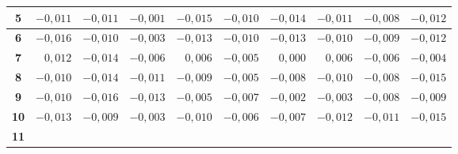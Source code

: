 \begin{table} [htbp]
{\begin{tabular}{|c|rrr|rrr|rrr|}
			\textbf{5}                  & 
			\multicolumn{1}{r|}{$-0,011$}        & \multicolumn{1}{r|}{$-0,011$}       & $-0,001$                            & \multicolumn{1}{r|}{$-0,015$}        & \multicolumn{1}{r|}{$-0,010$}       & $-0,014$                            & \multicolumn{1}{r|}{$-0,011$}        & \multicolumn{1}{r|}{$-0,008$}       & $-0,012$                            \\ \hline
			\textbf{6}                  & 
			\multicolumn{1}{r|}{$-0,016$}        & \multicolumn{1}{r|}{$-0,010$}       & $-0,003$                            & \multicolumn{1}{r|}{$-0,013$}        & \multicolumn{1}{r|}{$-0,010$}       & $-0,013$                            & \multicolumn{1}{r|}{$-0,010$}        & \multicolumn{1}{r|}{$-0,009$}       & $-0,012$                            \\ \hline
			\textbf{7}                  & 
			\multicolumn{1}{r|}{$ 0,012$}        & \multicolumn{1}{r|}{$-0,014$}       & $-0,006$                            & \multicolumn{1}{r|}{$ 0,006$}        & \multicolumn{1}{r|}{$-0,005$}       & $ 0,000$                            & \multicolumn{1}{r|}{$ 0,006$}        & \multicolumn{1}{r|}{$-0,006$}       & $-0,004$                            \\ \hline
			\textbf{8}                  & 
			\multicolumn{1}{r|}{$-0,010$}        & \multicolumn{1}{r|}{$-0,014$}       & $-0,011$                            & \multicolumn{1}{r|}{$-0,009$}        & \multicolumn{1}{r|}{$-0,005$}       & $-0,008$                            & \multicolumn{1}{r|}{$-0,010$}        & \multicolumn{1}{r|}{$-0,008$}       & $-0,015$                            \\ \hline
			\textbf{9}                  & 
			\multicolumn{1}{r|}{$-0,010$}        & \multicolumn{1}{r|}{$-0,016$}       & $-0,013$                            & \multicolumn{1}{r|}{$-0,005$}        & \multicolumn{1}{r|}{$-0,007$}       & $-0,002$                            & \multicolumn{1}{r|}{$-0,003$}        & \multicolumn{1}{r|}{$-0,008$}       & $-0,009$                            \\ \hline
			\textbf{10}                 & 
			\multicolumn{1}{r|}{$-0,013$}        & \multicolumn{1}{r|}{$-0,009$}       & $-0,003$                            & \multicolumn{1}{r|}{$-0,010$}        & \multicolumn{1}{r|}{$-0,006$}       & $-0,007$                            & \multicolumn{1}{r|}{$-0,012$}        & \multicolumn{1}{r|}{$-0,011$}       & $-0,015$                            \\ \hline
			\textbf{11}                 & 

\end{tabular}}
\end{table}
